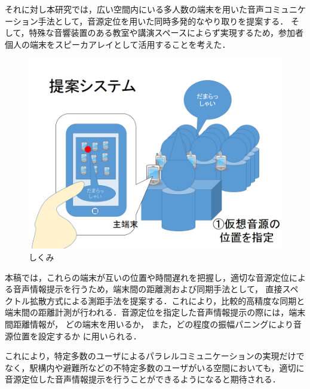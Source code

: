 それに対し本研究では，広い空間内にいる多人数の端末を用いた音声コミュニケーション手法として，音源定位を用いた同時多発的なやり取りを提案する．
そして，特殊な音響装置のある教室や講演スペースによらず実現するため，参加者個人の端末をスピーカアレイとして活用することを考えた．


\begin{figure}[tb]
  \centering
  \includegraphics[clip,width=1.05\hsize]{img/shikumi1.png}
  \caption{しくみ}\label{fig:shikumi1}
\end{figure}


本稿では，これらの端末が互いの位置や時間遅れを把握し，適切な音源定位による音声情報提示を行うため，端末間の距離測および同期手法として，
直接スペクトル拡散方式による測距手法を提案する．これにより，比較的高精度な同期と端末間の距離計測が行われる．音源定位を指定した音声情報提示の際には，端末間距離情報が，
どの端末を用いるか，
また，どの程度の振幅パニングにより音源位置を設定するか
に用いられる．

これにより，特定多数のユーザによるパラレルコミュニケーションの実現だけでなく，駅構内や避難所などの不特定多数のユーザがいる空間においても，適切に音源定位した音声情報提示を行うことができるようになると期待される．



\clearpage

